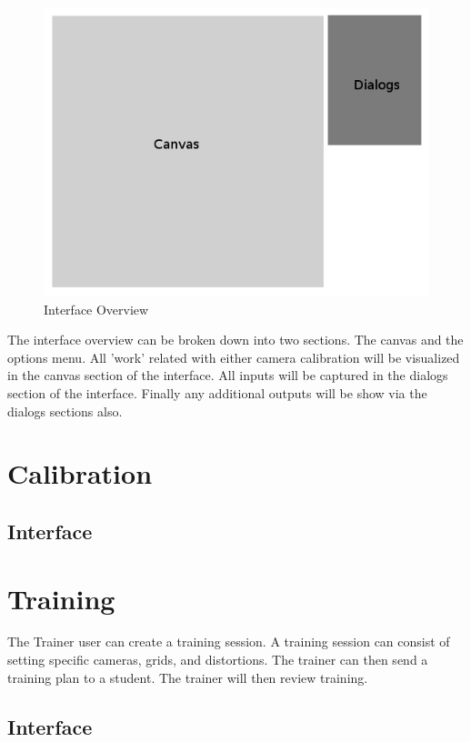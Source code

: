 \documentclass[11pt]{report}
\begin{document}
    \begin{figure}[htp]
    \centering
    \includegraphics[scale=0.45]{images/interface_screen.png}
    \caption{Interface Overview}
    \label{fig:is}
    \end{figure}

The interface overview can be broken down into two sections. The canvas and the options menu. All 'work' related with either camera calibration will be visualized in the canvas section of the interface. All inputs will be captured in the dialogs section of the interface. Finally any additional outputs will be show via the dialogs sections also.

\section{Calibration}

\subsection{Interface}

\section{Training}

The Trainer user can create a training session. A training session can consist of setting specific cameras, grids, and distortions. The trainer can then send a training plan to a student. 
The trainer will then review training. 
 
\subsection{Interface}
\end{document}
